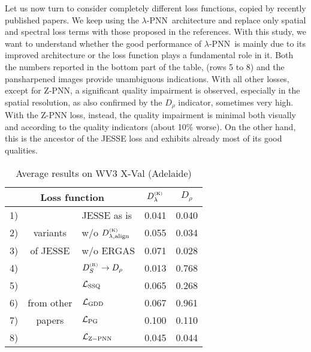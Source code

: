 \documentclass[journal]{IEEEtran}
\newcommand{\ru} {\rule{0mm}{3mm}}
\newcommand{\LL}{{\cal L}}
\newcommand{\DL} {D^{_{\rm (K)}}_\lambda}
\newcommand{\DLa}{D^{_{\rm (K)}}_{\lambda, \rm align}}
\newcommand{\DR} {D_{\rho}}
\newcommand{\DSR}{D^{_{\rm (R)}}_S}
\newcommand{\LPNN}  {$\lambda$-PNN}
\begin{document}
Let us now turn to consider completely different loss functions, copied by recently published papers.
We keep using the \LPNN\ architecture and replace only spatial and spectral loss terms with those proposed in the references.
With this study, we want to understand whether the good performance of \LPNN\ is mainly due to its improved architecture
or the loss function plays a fundamental role in it.
Both the numbers reported in the bottom part of the table, (rows 5 to 8) and the pansharpened images provide unambiguous indications.
With all other losses, except for Z-PNN, a significant quality impairment is observed, especially in the spatial resolution,
as also confirmed by the $\DR$ indicator, sometimes very high.
With the Z-PNN loss, instead, the quality impairment is minimal both visually and according to the quality indicators (about 10\% worse).
On the other hand, this is the ancestor of the JESSE loss and exhibits already most of its good qualities.

\begin{table}
\centering
\setlength{\tabcolsep}{3mm}
\begin{tabular}{l|c|l|cc} \hline
\multicolumn{3}{c}{\ru Loss function}                                  & $\DL$   & $\DR$   \\ \hline
1) &                        & \ru JESSE as is                          &  0.041  &  0.040  \\
2) & variants               & \ru w/o $\DLa$                           &  0.055  &  0.034  \\
3) & of JESSE               & \ru w/o ERGAS                            &  0.071  &  0.028  \\
4) &                        & \ru $\DSR \to \DR$                       &  0.013  &  0.768  \\ \hline
5) &                        & \ru $\LL_{\rm SSQ}$ \cite{Luo2020}       &  0.065  &  0.268  \\
6) & from other             & \ru $\LL_{\rm GDD}$ \cite{Uezato2020}    &  0.067  &  0.961  \\
7) & papers                 & \ru $\LL_{\rm PG}$ \cite{Ma2020}         &  0.100  &  0.110  \\
8) &                        & \ru $\LL_{\rm Z-PNN}$ \cite{Ciotola2022} &  0.045  &  0.044  \\ \hline
\end{tabular}
\caption{Average results on WV3 X-Val (Adelaide)}
\label{tab:loss_comparison}
\end{table}
\end{document}
